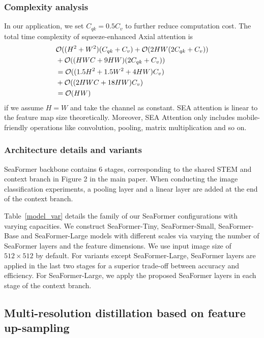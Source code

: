 
\subsubsection{Complexity analysis}
In our application, we set $C_{qk} = 0.5C_v$ to further reduce computation cost.
The total time complexity of squeeze-enhanced Axial attention is 
\begin{equation}
\begin{split}
    \notag&\mathcal{O}((H^2+W^2)(C_{qk}+C_v) + \mathcal{O}(2HW(2C_{qk} + C_v)) \\
    &+ \mathcal{O}((HWC+9HW)(2C_{qk}+C_{v})) \\
    &=\mathcal{O}((1.5H^2+1.5W^2+4HW)C_v) \\ 
    &+ \mathcal{O}((2HWC+18HW)C_v) \\
    &=\mathcal{O}(HW)
\end{split}
\end{equation}
if we assume $H=W$ and take the channel as constant. SEA attention is linear to the feature map size theoretically.
Moreover, SEA Attention only includes mobile-friendly operations like convolution, pooling, matrix multiplication and so on.

\subsubsection{Architecture details and variants}
SeaFormer backbone contains 6 stages, corresponding to the shared STEM and context branch in Figure 2 in the main paper. When conducting the image classification experiments, a pooling layer and a linear layer are added at the end of the context branch.

Table~\ref{model_var} details the family of our SeaFormer configurations with varying capacities.
We construct SeaFormer-Tiny, SeaFormer-Small,  SeaFormer-Base and SeaFormer-Large models with different scales via varying the number of SeaFormer layers and the feature dimensions. 
We use input image size of $512 \times 512$ by default. 
For variants except SeaFormer-Large, SeaFormer layers are applied in the last two stages for a superior trade-off between accuracy and efficiency. 
For SeaFormer-Large, we apply the proposed SeaFormer layers in each stage of the context branch.



\subsection{Multi-resolution distillation based on feature up-sampling}

